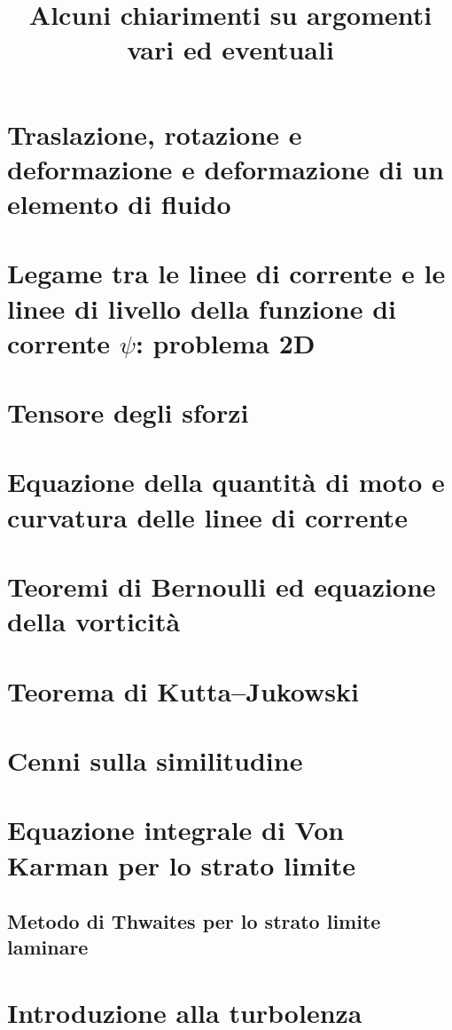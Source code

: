 \documentclass[11pt,fleqn]{article}
\title{Alcuni chiarimenti su argomenti vari ed eventuali}
\begin{document}
\maketitle

\tableofcontents


\section{Traslazione, rotazione e deformazione e deformazione di un elemento di fluido}

\clearpage \newpage

\section{Legame tra le linee di corrente e le linee di livello della funzione di corrente $\psi$: problema 2D}

\clearpage \newpage

\section{Tensore degli sforzi}

\clearpage \newpage

\section{Equazione della quantità di moto e curvatura delle linee di corrente}

\clearpage \newpage

\section{Teoremi di Bernoulli ed equazione della vorticità}

\clearpage \newpage

\section{Teorema di Kutta--Jukowski}

\clearpage \newpage

\section{Cenni sulla similitudine}

\clearpage \newpage

\section{Equazione integrale di Von Karman per lo strato limite}


\subsection{Metodo di Thwaites per lo strato limite laminare}

\clearpage \newpage

\section{Introduzione alla turbolenza}

\end{document}
